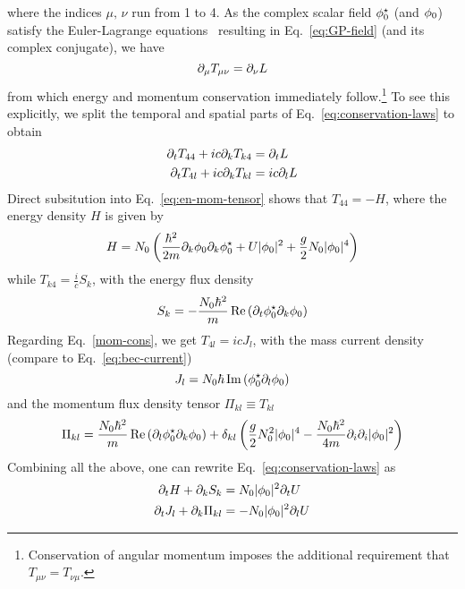 \begin{subappendices}
\begin{equation}
\end{equation}
% 
where the indices $\mu,\,\nu$ run from 1 to 4. As the complex scalar
field $\phi_{0}^{\star}$ (and $\phi_{0}$) satisfy the Euler-Lagrange
equations~\cite{Landau:101804} resulting in Eq.~\eqref{eq:GP-field}
(and its complex conjugate), we have
%
\begin{equation}\label{eq:conservation-laws}
  \partial_{\mu} T_{\mu\nu} = \partial_{\nu} L
\end{equation}
% 
from which energy and momentum conservation immediately
follow.\footnote{Conservation of angular momentum imposes the
  additional requirement that $T_{\mu\nu} = T_{\nu\mu}$.}
%
To see this explicitly, we split the temporal and spatial parts of
Eq.~\eqref{eq:conservation-laws} to obtain
%
\begin{align}
  \partial_t T_{4 4} + i c \partial_{k} T_{k 4} & = \partial_t L\label{energy-cons}\\
  \partial_t T_{4 l} + i c \partial_{k} T_{k l} & = i c \partial_{l} L\label{mom-cons}
\end{align}
%
Direct subsitution into Eq.~\eqref{eq:en-mom-tensor} shows that
$T_{4 4} = -H$, where the energy density $H$ is given by
%
\begin{equation}\label{eq:en-density}
  H = N_0\left(
\frac{\hbar^2}{2m}\partial_k\phi_{0}\partial_k\phi_{0}^{\star} + U\vert \phi_{0} \vert^2 + \frac{g}{2}N_0\vert \phi_{0} \vert^4 \right)
\end{equation}
% 
while $T_{k 4} = \frac{i}{c}S_k$, with the energy flux density
%
\begin{equation}\label{eq:energy-source}
  S_k = -\frac{N_0\hbar^2}{m}\operatorname{Re}\left(\partial_t\phi_{0}^{\star}\partial_k\phi_{0}\right)
\end{equation}
% 
Regarding Eq.~\eqref{mom-cons}, we get $T_{4 l} = i c J_l$, with the mass
current density (compare to Eq.~\eqref{eq:bec-current})
\begin{equation}\label{eq:current}
  J_l = N_0\hbar\operatorname{Im}\left(\phi_{0}^{\star} \partial_l \phi_{0}\right)
\end{equation}
and the momentum flux density tensor $\Pi_{kl} \equiv T_{kl}$
%
\begin{equation}
  \Pi_{kl} = \frac{N_0\hbar^2}{m}\operatorname{Re}\left(\partial_l\phi_{0}^{\star}\partial_k\phi_{0}\right) + \delta_{kl}\left(\frac{g}{2}N_0^2\vert \phi_{0} \vert^4 -
    \frac{N_0\hbar^2}{4m}\partial_i\partial_i\vert \phi_{0} \vert^2\right)
\end{equation}
% 
Combining all the above, one can rewrite
Eq.~\eqref{eq:conservation-laws} as
%
\begin{align}
  \pa_t H + \pa_{k} S_k & = N_0\abs{\p}^2 \pa_{t} U\\
  \pa_t J_l  + \pa_{k} \Pi_{k l} & = -N_0\abs{\p}^2 \pa_{l} U\label{eq:mom-cons-pi}

\end{align}
\end{subappendices}
